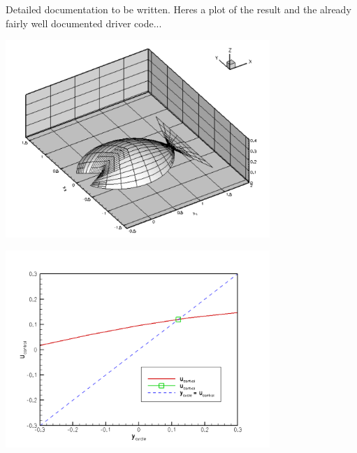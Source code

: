 Detailed documentation to be written. Here\textquotesingle{}s a plot of the result and the already fairly well documented driver code...

 
\begin{DoxyImage}
\includegraphics[width=0.75\textwidth]{elastic_fish}
\end{DoxyImage}


 
\begin{DoxyImage}
\includegraphics[width=0.75\textwidth]{trace}
\end{DoxyImage}



